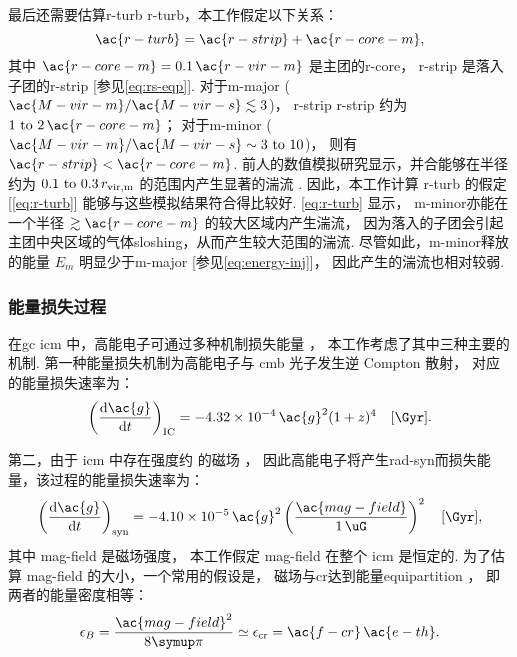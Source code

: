 最后还需要估算\acl{r-turb} \ac{r-turb}，本工作假定以下关系：
\begin{equation}
  \label{eq:r-turb}
  \ac{r-turb} = \ac{r-strip} + \ac{r-core-m} ,
\end{equation}
其中
$\ac{r-core-m} = 0.1 \,\ac{r-vir-m}$ 是主团的\acl{r-core}，
\ac{r-strip} 是落入子团的\acl{r-strip} [参见\autoref{eq:rs-eqp}].
对于\ac{m-major} ($\ac{M-vir-m} / \ac{M-vir-s} \lesssim 3$)，
\acl{r-strip} \ac{r-strip} 约为 $\numrange{1}{2} \,\ac{r-core-m}$；
对于\ac{m-minor} ($\ac{M-vir-m} / \ac{M-vir-s} \sim \numrange{3}{10}$)，
则有 $\ac{r-strip} < \ac{r-core-m}$.
前人的数值模拟研究显示，并合能够在半径约为 $\numrange{0.1}{0.3} \,r_{\R{vir,m}}$
的范围内产生显著的湍流 \cite{vazza2011,vazza2012,miniati2015ss}.
因此，本工作计算 \ac{r-turb} 的假定 [\autoref{eq:r-turb}]
能够与这些模拟结果符合得比较好.
\autoref{eq:r-turb} 显示，
\ac{m-minor}亦能在一个半径 $\gtrsim \ac{r-core-m}$ 的较大区域内产生湍流，
因为落入的子团会引起主团中央区域的气体\ac{sloshing}，从而产生较大范围的湍流.
尽管如此，\ac{m-minor}释放的能量 $E_m$ 明显少于\ac{m-major}
[参见\autoref{eq:energy-inj}]，
因此产生的湍流也相对较弱.

\subsubsection{能量损失过程}

在\ac{gc} \ac{icm} 中，高能电子可通过多种机制损失能量 \cite{sarazin1999}，
本工作考虑了其中三种主要的机制.
第一种能量损失机制为高能电子与 \ac{cmb} 光子发生逆 Compton 散射，
对应的能量损失速率为：
\begin{equation}
  \label{eq:eloss-ic}
  \left( \diff{\ac{g}}{t} \right)_{\R{IC}} =
    \num{-4.32e-4} \,\ac{g}^2 (1+z)^4
    \quad [\si{\per\Gyr}] .
\end{equation}

第二，由于 \ac{icm} 中存在强度约 \si{\uG} 的磁场 \cite{govoni2004,ryu2008}，
因此高能电子将产生\ac{rad-syn}而损失能量，该过程的能量损失速率为：
\begin{equation}
  \label{eq:eloss-syn}
  \left( \diff{\ac{g}}{t} \right)_{\R{syn}} =
    \num{-4.10e-5} \,\ac{g}^2
    \left( \frac{\ac{mag-field}}{\SI{1}{\uG}} \right)^2
    \quad [\si{\per\Gyr}] ,
\end{equation}
其中 \ac{mag-field} 是磁场强度，
本工作假定 \ac{mag-field} 在整个 \ac{icm} 是恒定的.
为了估算 \ac{mag-field} 的大小，一个常用的假设是，
磁场与\ac{cr}达到能量\ac{equipartition} \cite{beck2005}，
即两者的能量密度相等：
\begin{equation}
  \epsilon_B = \frac{\ac{mag-field}^2}{8\Cpi}
    \simeq \epsilon_{\R{cr}} = \ac{f-cr}\,\ac{e-th} .
\end{equation}

